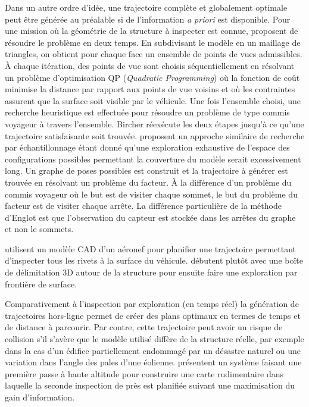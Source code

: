 Dans un autre ordre d'idée, une trajectoire complète et globalement optimale peut être générée au préalable si de l'information \textit{a priori} est disponible. Pour une mission où la géométrie de la structure à inspecter est connue, \cite{Bircher2015} proposent de résoudre le problème en deux temps. En subdivisant le modèle en un maillage de triangles, on obtient pour chaque face un ensemble de points de vues admissibles. À chaque itération, des points de vue sont choisis séquentiellement en résolvant un problème d'optimisation QP (\emph{Quadratic Programming}) où la fonction de coût minimise la distance par rapport aux points de vue voisins et où les contraintes assurent que la surface soit visible par le véhicule. Une fois l'ensemble choisi, une recherche heuristique est effectuée pour résoudre un problème de type commis voyageur à travers l'ensemble. Bircher réexécute les deux étapes jusqu'à ce qu'une trajectoire satisfaisante soit trouvée. \cite{Englot2010} proposent un approche similaire de recherche par échantillonnage étant donné qu'une exploration exhaustive de l'espace des configurations possibles permettant la couverture du modèle serait excessivement long. Un graphe de poses possibles est construit et la trajectoire à générer est trouvée en résolvant un problème du facteur. À la différence d'un problème du commis voyageur où le but est de visiter chaque sommet, le but du problème du facteur est de visiter chaque arrête. La différence particulière de la méthode d'Englot est que l'observation du capteur est stockée dans les arrêtes du graphe et non le sommets.

\cite{sheng2008crawler} utilisent un modèle CAD d'un aéronef pour planifier une trajectoire permettant d'inspecter tous les rivets à la surface du véhicule. \cite{Yoder2016} débutent plutôt avec une boîte de délimitation 3D autour de la structure pour ensuite faire une exploration par frontière de surface.

Comparativement à l'inspection par exploration (en temps réel) la génération de trajectoires hors-ligne permet de créer des plans optimaux en termes de temps et de distance à parcourir. Par contre, cette trajectoire peut avoir un risque de collision s'il s'avère que le modèle utilisé diffère de la structure réelle, par exemple dans la cas d'un édifice partiellement endommagé par un désastre naturel ou une variation dans l'angle des pales d'une éolienne. \cite{Hepp2017} présentent un système faisant une première passe à haute altitude pour construire une carte rudimentaire dans laquelle la seconde inspection de près est planifiée suivant une maximisation du gain d'information.

